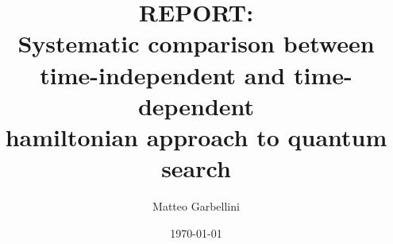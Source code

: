 \documentclass[aps,pra,reprint, onecolumn]{revtex4-2}
\begin{document}

\title{REPORT: \\ Systematic comparison between time-independent and time-dependent \\ hamiltonian approach to quantum search}


\author{Matteo Garbellini}


\date{\today}

\end{document}
